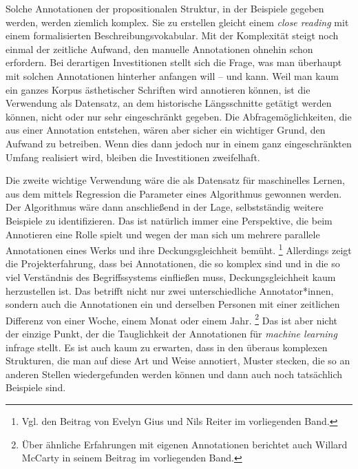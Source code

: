 \documentclass{article}
\newcommand*{\englisch}[1]{\foreignlanguage{english}{\textit{#1}}}%
\begin{document}
Solche Annotationen der propositionalen Struktur, in der Beispiele
gegeben werden, werden ziemlich komplex. Sie zu erstellen gleicht
einem \englisch{close reading} mit einem formalisierten
Beschreibungsvokabular. Mit der Komplexität steigt noch einmal der
zeitliche Aufwand, den manuelle Annotationen ohnehin schon
erfordern. Bei derartigen Investitionen stellt sich die Frage, was man
überhaupt mit solchen Annotationen hinterher anfangen will -- und
kann. Weil man kaum ein ganzes Korpus ästhetischer Schriften wird
annotieren können, ist die Verwendung als Datensatz, an dem
historische Längsschnitte getätigt werden können, nicht oder nur sehr
eingeschränkt gegeben. Die Abfragemöglichkeiten, die aus einer
Annotation entstehen, wären aber sicher ein wichtiger Grund, den
Aufwand zu betreiben. Wenn dies dann jedoch nur in einem ganz
eingeschränkten Umfang realisiert wird, bleiben die Investitionen
zweifelhaft.

Die zweite wichtige Verwendung wäre die als Datensatz für maschinelles
Lernen, aus dem mittels Regression die Parameter eines Algorithmus
gewonnen werden. Der Algorithmus wäre dann anschließend in der Lage,
selbstständig weitere Beispiele zu identifizieren. Das ist natürlich
immer eine Perspektive, die beim Annotieren eine Rolle spielt und
wegen der man sich um mehrere parallele Annotationen eines Werks und
ihre Deckungsgleichheit bemüht.%
\footnote{Vgl. den Beitrag von Evelyn Gius und Nils Reiter im
  vorliegenden Band.} %
Allerdings zeigt die Projekterfahrung, dass bei Annotationen, die so
komplex sind und in die so viel Verständnis des Begriffssystems
einfließen muss, Deckungsgleichheit kaum herzustellen ist. Das
betrifft nicht nur zwei unterschiedliche Annotator*innen, sondern auch
die Annotationen ein und derselben Personen mit einer zeitlichen
Differenz von einer Woche, einem Monat oder einem Jahr.%
\footnote{Über ähnliche Erfahrungen mit eigenen Annotationen berichtet
  auch Willard McCarty in seinem Beitrag im vorliegenden Band.} %
Das ist aber nicht der einzige Punkt, der die Tauglichkeit der
Annotationen für \englisch{machine learning} infrage stellt. Es ist
auch kaum zu erwarten, dass in den überaus komplexen Strukturen, die
man auf diese Art und Weise annotiert, Muster stecken, die so an
anderen Stellen wiedergefunden werden können und dann auch noch
tatsächlich Beispiele sind.
\end{document}
